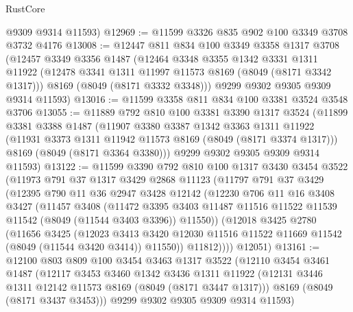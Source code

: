 \begin{lexlean}{RustCore}
\begin{coremodule}
      @9309
      @9314
      @11593)
@12969 := @11599 @3326 @835 @902 @100 @3349 @3708 @3732 @4176
@13008 := @12447
    @811
    @834
    @100
    @3349
    @3358
    @1317
    @3708
    (@12457
      @3349
      @3356
      @1487
      (@12464
        @3348
        @3355
        @1342
        @3331
        @1311
        @11922
        (@12478 @3341 @1311 @11997 @11573 @8169 (@8049 (@8171 @3342 @1317)))
        @8169
        (@8049 (@8171 @3332 @3348)))
      @9299
      @9302
      @9305
      @9309
      @9314
      @11593)
@13016 := @11599 @3358 @811 @834 @100 @3381 @3524 @3548 @3706
@13055 := @11889
    @792
    @810
    @100
    @3381
    @3390
    @1317
    @3524
    (@11899
      @3381
      @3388
      @1487
      (@11907
        @3380
        @3387
        @1342
        @3363
        @1311
        @11922
        (@11931 @3373 @1311 @11942 @11573 @8169 (@8049 (@8171 @3374 @1317)))
        @8169
        (@8049 (@8171 @3364 @3380)))
      @9299
      @9302
      @9305
      @9309
      @9314
      @11593)
@13122 := @11599
    @3390
    @792
    @810
    @100
    @1317
    @3430
    @3454
    @3522
    (@11973
      @791
      @37
      @1317
      @3429
      @2868
      @11123
      (@11797
        @791
        @37
        @3429
        (@12395
          @790
          @11
          @36
          @2947
          @3428
          @12142
          (@12230
            @706
            @11
            @16
            @3408
            @3427
            (@11457
              @3408
              (@11472
                @3395
                @3403
                @11487
                @11516
                @11522
                @11539
                @11542
                (@8049 (@11544 @3403 @3396))
                @11550))
            (@12018
              @3425
              @2780
              (@11656
                @3425
                (@12023
                  @3413
                  @3420
                  @12030
                  @11516
                  @11522
                  @11669
                  @11542
                  (@8049 (@11544 @3420 @3414))
                  @11550))
              @11812))))
      @12051)
@13161 := @12100
    @803
    @809
    @100
    @3454
    @3463
    @1317
    @3522
    (@12110
      @3454
      @3461
      @1487
      (@12117
        @3453
        @3460
        @1342
        @3436
        @1311
        @11922
        (@12131 @3446 @1311 @12142 @11573 @8169 (@8049 (@8171 @3447 @1317)))
        @8169
        (@8049 (@8171 @3437 @3453)))
      @9299
      @9302
      @9305
      @9309
      @9314
      @11593)

\end{coremodule}
\end{lexlean}
